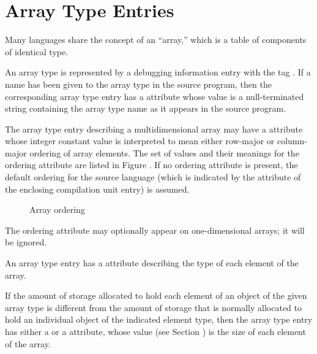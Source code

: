 \section{Array Type Entries}
\label{chap:arraytypeentries}

Many languages share the concept of an ``array,'' which is
a table of components of identical type.

An array type is represented by a debugging information entry
with the tag . 
If a name has been given to
the array type in the source program, then the corresponding
array type entry has a  attribute whose value is a
null-terminated string containing the array type name as it
appears in the source program.

The array type entry describing a multidimensional array may
have a  attribute whose integer constant value is
interpreted to mean either row-major or column-major ordering
of array elements. The set of values and their meanings
for the ordering attribute are listed in 
Figure . 
If no
ordering attribute is present, the default ordering for the
source language (which is indicated by the 
attribute of the enclosing compilation unit entry) is assumed.

\begin{figure}[here]
\caption{Array ordering}\label{fig:arrayordering}
\end{figure}

The ordering attribute may optionally appear on one-dimensional
arrays; it will be ignored.

An array type entry has a  attribute describing
the type of each element of the array.

If the amount of storage allocated to hold each element of an
object of the given array type is different from the amount
of storage that is normally allocated to hold an individual
object of the indicated element type, then the array type
entry has either a  or a 
attribute, whose value 
(see Section ) 
is the size of each
element of the array.

